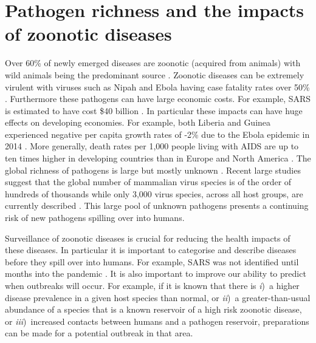 
\section{Pathogen richness and the impacts of zoonotic diseases}




Over 60\% of newly emerged diseases are zoonotic (acquired from animals) with wild animals being the predominant source \cite{jones2008global, woolhouse2006host, taylor2001risk}.
Zoonotic diseases can be extremely virulent with viruses such as Nipah  and Ebola having case fatality rates over 50\% \cite{luby2009recurrent, lefebvre2014case}.
Furthermore these pathogens can have large economic costs.
For example, SARS is estimated to have cost \$40 billion \cite{knobler2004learning}.
In particular these impacts can have huge effects on developing economies.
For example, both Liberia and Guinea experienced negative per capita growth rates of -2\% due to the Ebola epidemic in 2014 \cite{ebolaWorldbank, ebola2015worldbank}.
More generally, death rates per 1,000 people living with AIDS are up to ten times higher in developing countries than in Europe and North America \cite{granich2015trends}.
The global richness of pathogens is large but mostly unknown \cite{poulin2014parasite}.
Recent large studies suggest that the global number of mammalian virus species is of the order of hundreds of thousands \cite{anthony2013strategy} while only 3,000 virus species, across all host groups, are currently described \cite{ICTV}.
This large pool of unknown pathogens presents a continuing risk of new pathogens spilling over into humans.



Surveillance of zoonotic diseases is crucial for reducing the health impacts of these diseases.
In particular it is important to categorise and describe diseases before they spill over into humans.
For example, SARS was not identified until months into the pandemic \cite{drosten2003identification}. 
It is also important to improve our ability to predict when outbreaks will occur. 
For example, if it is known that there is \textit{i})~a higher disease prevalence in a given host species than normal, or \textit{ii})~a greater-than-usual abundance of a species that is a known reservoir of a high risk zoonotic disease, or \textit{iii})~increased contacts between humans and a pathogen reservoir, preparations can be made for a potential outbreak in that area.


